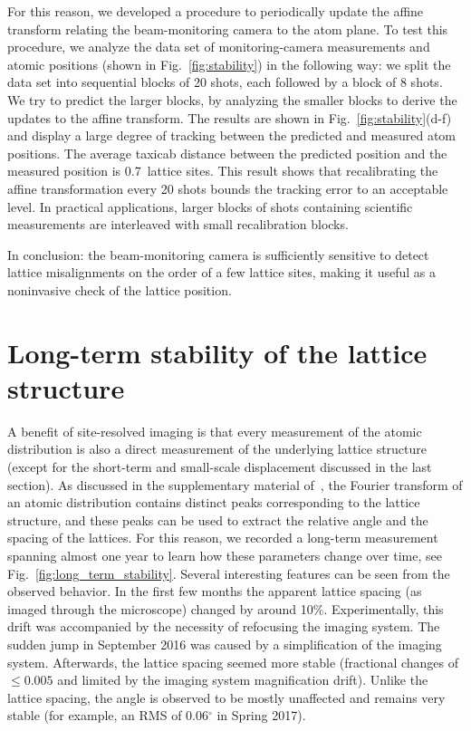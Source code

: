 \documentclass[twocolumn,aip,rsi,reprint,bibnotes]{revtex4-1}
\begin{document}
For this reason, we developed a procedure to periodically update the affine transform relating the beam-monitoring camera to the atom plane.
To test this procedure, we analyze the data set of monitoring-camera measurements and atomic positions (shown in Fig.~\ref{fig:stability}) in the following way: we split the data set into sequential blocks of 20 shots, each followed by a block of 8 shots.
We try to predict the larger blocks, by analyzing the smaller blocks to derive the updates to the affine transform.
The results are shown in Fig.~\ref{fig:stability}(d-f) and display a large degree of tracking between the predicted and measured atom positions.
The average taxicab distance between the predicted position and the measured position is 0.7~lattice sites.
This result shows that recalibrating the affine transformation every 20 shots bounds the tracking error to an acceptable level. In practical applications, larger blocks of shots containing scientific measurements are interleaved with small recalibration blocks.

In conclusion: the beam-monitoring camera is sufficiently sensitive to detect lattice misalignments on the order of a few lattice sites, making it useful as a noninvasive check of the lattice position.


\section{Long-term stability of the lattice structure}
A benefit of site-resolved imaging is that every measurement of the atomic distribution is also a direct measurement of the underlying lattice structure (except for the short-term and small-scale displacement discussed in the last section).
As discussed in the supplementary material of~\cite{Parsons2016, Greif2016}, the Fourier transform of an atomic distribution contains distinct peaks corresponding to the lattice structure, and these peaks can be used to extract the relative angle and the spacing of the lattices.
For this reason, we recorded a long-term measurement spanning almost one year to learn how these parameters change over time, see Fig.~\ref{fig:long_term_stability}.
Several interesting features can be seen from the observed behavior. In the first few months the apparent lattice spacing (as imaged through the microscope) changed by around 10\%. Experimentally, this drift was accompanied by the necessity of refocusing the imaging system. The sudden jump in September 2016 was caused by a simplification of the imaging system. Afterwards, the lattice spacing seemed more stable (fractional changes of $\leq 0.005$ and limited by the imaging system magnification drift). Unlike the lattice spacing, the angle is observed to be mostly unaffected and remains very stable (for example, an RMS of 0.06$^\circ$ in Spring 2017).
\end{document}
